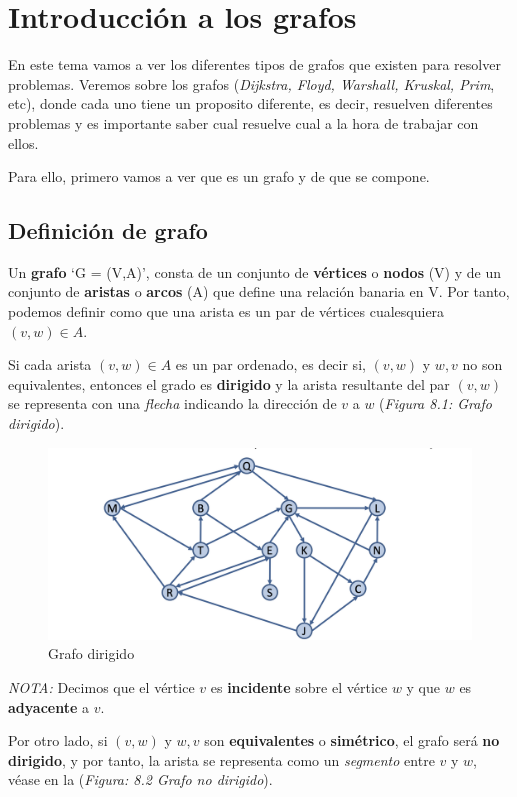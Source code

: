 \chapter{Introducción a los grafos}
En este tema vamos a ver los diferentes tipos de grafos que existen para resolver problemas.
Veremos sobre los grafos (\textit{Dijkstra, Floyd, Warshall, Kruskal, Prim}, etc), donde cada uno tiene un proposito diferente, es decir, resuelven diferentes problemas y es importante saber cual resuelve cual a la hora de trabajar con ellos.

Para ello, primero vamos a ver que es un grafo y de que se compone.
\section{Definición de grafo}
Un \textbf{grafo} `G = (V,A)', consta de un conjunto de \textbf{vértices} o \textbf{nodos} (V) y de un conjunto de \textbf{aristas} o \textbf{arcos} (A) que define una relación banaria en V. Por tanto, podemos definir como que una arista es un par de vértices cualesquiera \((v,w) \in A\).

Si cada arista \((v,w) \in A\) es un par ordenado, es decir si, \((v,w)\) y \(w,v\) no son equivalentes, entonces el grado es \textbf{dirigido} y la arista resultante del par \((v,w)\) se representa con una \textit{flecha} indicando la dirección de \(v\) a \(w\) (\textit{Figura 8.1: Grafo dirigido}).
\begin{figure}[h]
  \begin{center}
    \includegraphics[width=.6\textwidth]{assets/intrografo1.png}
  \end{center}
  \caption{Grafo dirigido}
\end{figure}

\textit{NOTA: }Decimos que el vértice \(v\) es \textbf{incidente} sobre el vértice \(w\) y que \(w\) es \textbf{adyacente} a \(v\).

Por otro lado, si \((v,w)\) y \(w,v\) son \textbf{equivalentes} o \textbf{simétrico}, el grafo será \textbf{no dirigido}, y por tanto, la arista se representa como un \textit{segmento} entre \(v\) y \(w\), véase en la (\textit{Figura: 8.2 Grafo no dirigido}).

